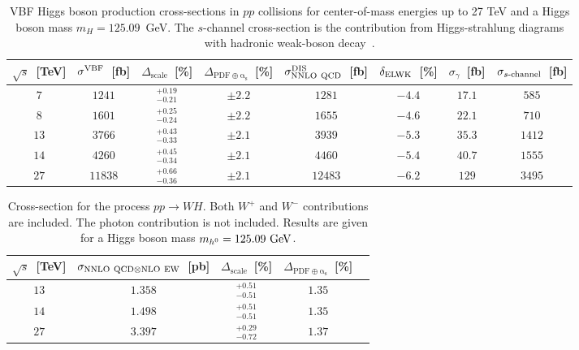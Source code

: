 \begin{table}
\centering
\begin{tabular}{ccccccc|c}%
\toprule
$\sqrt{s}$~[TeV] & $\sigma^{\rm VBF}$~[fb] & $\Delta_{\mathrm{scale}}$~[\%] &
$\Delta_{\mathrm{PDF\oplus\alpha_s}}$~[\%] &
$\sigma_{\rm NNLO~ QCD}^{\rm DIS}$~[fb] & $\delta_{\rm ELWK}$~[\%] & $\sigma_{\gamma}$~[fb] & $\sigma_{\mbox{\scriptsize $s$-channel}}$~[fb]
\\
\midrule
$7$  & $1241$  &$^{+0.19}_{-0.21}$ &$\pm2.2$ &$1281$  & $-4.4$ & $17.1$ & $585$ \\
$8$  & $1601$  &$^{+0.25}_{-0.24}$ &$\pm2.2$ &$1655$  & $-4.6$ & $22.1$ & $710$ \\
$13$ & $3766$  &$^{+0.43}_{-0.33}$ &$\pm2.1$ &$3939$  & $-5.3$ & $35.3$ & $1412$ \\
$14$ & $4260$  &$^{+0.45}_{-0.34}$ &$\pm2.1$ &$4460$  & $-5.4$ & $40.7$ & $1555$ \\
$27$ & $11838$ &$^{+0.66}_{-0.36}$ &$\pm2.1$ &$12483$ & $-6.2$ & $129$  & $3495$ \\
\bottomrule
\end{tabular}%
\caption{VBF Higgs boson production cross-sections in $pp$ collisions for center-of-mass energies
up to 27 TeV and a Higgs boson mass $m_H=125.09$~GeV.  The $s$-channel cross-section is the contribution
from Higgs-strahlung diagrams with hadronic weak-boson decay~\cite{deFlorian:2016spz}.}
\label{tab:vbf_xsec}
\end{table}


\label{sec:he-lhc-VH}

\begin{table}
\centering
\begin{tabular}{ccccc}%
\toprule
$\sqrt{s}$~[TeV] & $\sigma_{{\rm NNLO~QCD}\otimes{\rm NLO~EW}}$~[pb] & $\Delta_{\mathrm{scale}}$~[\%] &
$\Delta_{\mathrm{PDF\oplus\alpha_s}}$~[\%] \\
\midrule
$13$ & $1.358$ & $^{+0.51}_{-0.51}$ & $1.35$ \\
$14$ & $1.498$ & $^{+0.51}_{-0.51}$ & $1.35$ \\
$27$ & $3.397$ & $^{+0.29}_{-0.72}$ & $1.37$ \\
\bottomrule
\end{tabular}%
\caption{Cross-section for the process $p p \to WH$. Both $W^+$ and $W^-$ contributions are included.
The photon contribution is not included. Results are given for a Higgs boson mass $m_{h^0} = 125.09~{\rm GeV}$.}
\label{tab:wh_xsec}
\end{table}

